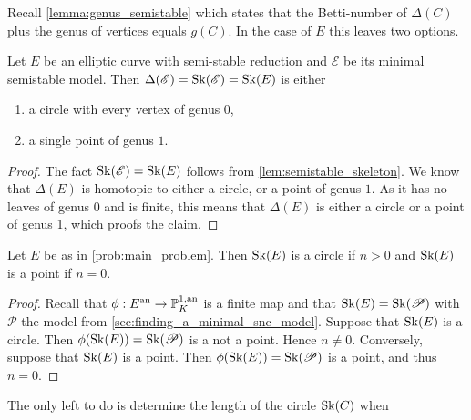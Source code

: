 Recall \cref{lemma:genus_semistable} which states that the Betti-number of $\Delta(C)$ plus the genus of vertices equals $g(C)$. 
In the case of $E$ this leaves two options. 
\begin{lemma}\label{lem:point_or_circle}
	Let $E$ be an elliptic curve with semi-stable reduction and $\mathscr E$ be its minimal semistable model. 
	Then $\Delta(\mathscr E) = \operatorname{Sk}(\mathscr E) = \operatorname{Sk}(E)$ is either 
	\begin{enumerate}
		\item a circle with every vertex of genus $0$,
		\item a single point of genus  $1$. 
	\end{enumerate}
\end{lemma}
\begin{proof}
	The fact $\operatorname{Sk}(\mathscr E) = \operatorname{Sk}(E)$ follows from \cref{lem:semistable_skeleton}. 
	We know that $\Delta(E)$ is homotopic to either a circle, or a point of genus $1$. 
	As it has no leaves of genus $0$ and is finite, this means that $\Delta(E)$ is either a circle or a point of genus 1, which proofs the claim.
\end{proof}

\begin{lemma}
	Let $E$ be as in \cref{prob:main_problem}. 
	Then $\operatorname{Sk}(E)$ is a circle if $n > 0$ and $\operatorname{Sk}(E)$ is a point if $n = 0$. 
\end{lemma}
\begin{proof}
	Recall that $\phi: E{}^{\text{an}} \to \mathbb{P}^{1, \text{an}}_K$ is a finite map and that $\operatorname{Sk}(E) = \operatorname{Sk}(\mathscr P)$ with $\mathscr P$ the model from \cref{sec:finding_a_minimal_snc_model}.
	Suppose that $\operatorname{Sk}(E)$ is a circle. 
	Then $\phi(\operatorname{Sk}(E))= \operatorname{Sk}(\mathscr P)$ is a not a point. 
	Hence $n \ne 0$. 
	Conversely, suppose that $\operatorname{Sk}(E)$ is a point. 
	Then $\phi(\operatorname{Sk}(E)) = \operatorname{Sk}(\mathscr P)$ is a point, and thus $n  = 0$. 
\end{proof}

The only left to do is determine the length of the circle $\operatorname{Sk}(C)$ when 

